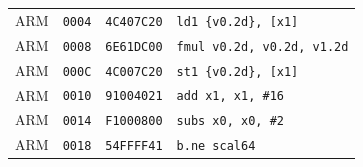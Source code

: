 \begin{table}[htbp]
\begin{tabular}{@{}l|l|l|p{7.2cm}@{}}
ARM & \texttt{0004} & \texttt{4C407C20} & \texttt{ld1 \{v0.2d\}, [x1]} \\
ARM & \texttt{0008} & \texttt{6E61DC00} & \texttt{fmul v0.2d, v0.2d, v1.2d} \\
ARM & \texttt{000C} & \texttt{4C007C20} & \texttt{st1 \{v0.2d\}, [x1]} \\
ARM & \texttt{0010} & \texttt{91004021} & \texttt{add x1, x1, \#16} \\
ARM & \texttt{0014} & \texttt{F1000800} & \texttt{subs x0, x0, \#2} \\
ARM & \texttt{0018} & \texttt{54FFFF41} & \texttt{b.ne scal64} \\
\bottomrule
\end{tabular}
\endgroup
\end{table}
\noindent{}\par
